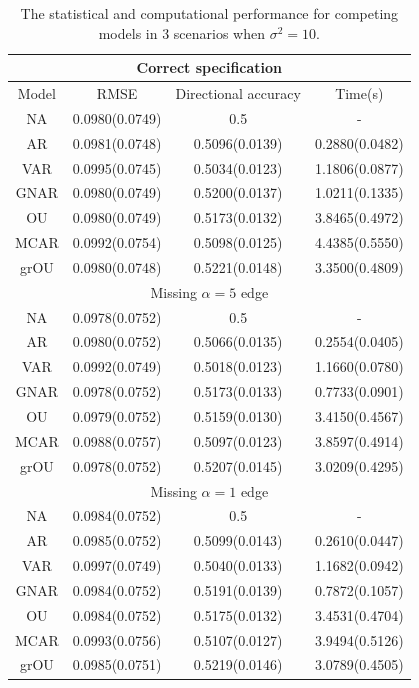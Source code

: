\documentclass[12pt]{amsart}
\numberwithin{equation}{section}
\newcommand{\1}{\mathbf{1}}
\begin{document}
\begin{table}[htbp]
\centering
\begin{tabular}{|c|c|c|c|}
\hline
\multicolumn{4}{|c|}{Correct specification}
\\
\hline
Model & RMSE & Directional accuracy & Time(s) \\ \hline
NA   & 0.0980(0.0749) & 0.5 & -\\
AR   & 0.0981(0.0748) & 0.5096(0.0139) & 0.2880(0.0482)\\
VAR  & 0.0995(0.0745) & 0.5034(0.0123) & 1.1806(0.0877)\\
GNAR & 0.0980(0.0749) & 0.5200(0.0137) & 1.0211(0.1335)\\
OU   & 0.0980(0.0749) & 0.5173(0.0132) & 3.8465(0.4972)\\
MCAR & 0.0992(0.0754) & 0.5098(0.0125) & 4.4385(0.5550)\\
grOU & 0.0980(0.0748) & 0.5221(0.0148) & 3.3500(0.4809)\\ \hline

\multicolumn{4}{|c|}{Missing $\alpha = 5$ edge}
\\
\hline
NA   & 0.0978(0.0752) & 0.5 & -\\
AR   & 0.0980(0.0752) & 0.5066(0.0135) & 0.2554(0.0405)\\
VAR  & 0.0992(0.0749) & 0.5018(0.0123) & 1.1660(0.0780)\\
GNAR & 0.0978(0.0752) & 0.5173(0.0133) & 0.7733(0.0901)\\
OU   & 0.0979(0.0752) & 0.5159(0.0130) & 3.4150(0.4567)\\
MCAR & 0.0988(0.0757) & 0.5097(0.0123) & 3.8597(0.4914)\\
grOU & 0.0978(0.0752) & 0.5207(0.0145) & 3.0209(0.4295)\\ \hline

\multicolumn{4}{|c|}{Missing $\alpha = 1$ edge}
\\
\hline
NA   & 0.0984(0.0752) & 0.5 & -\\
AR   & 0.0985(0.0752) & 0.5099(0.0143) & 0.2610(0.0447)\\
VAR  & 0.0997(0.0749) & 0.5040(0.0133) & 1.1682(0.0942)\\
GNAR & 0.0984(0.0752) & 0.5191(0.0139) & 0.7872(0.1057)\\
OU   & 0.0984(0.0752) & 0.5175(0.0132) & 3.4531(0.4704)\\
MCAR & 0.0993(0.0756) & 0.5107(0.0127) & 3.9494(0.5126)\\
grOU & 0.0985(0.0751) & 0.5219(0.0146) & 3.0789(0.4505)\\ \hline
\end{tabular}
\caption{The statistical and computational performance for competing models in 3 scenarios when $\sigma^2=10$.}
\label{sim_table_10}
\end{table}
\end{document}
